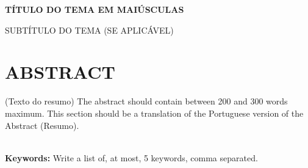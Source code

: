 \begingroup
\begin{flushleft}
\bfseries
{}
{\Large
TÍTULO DO TEMA EM MAIÚSCULAS}
	
\mdseries		%
{\Large SUBTÍTULO DO TEMA (SE APLICÁVEL)}
\end{flushleft}
\normalsize
\let\clearpage\relax
\chapter{ABSTRACT}
\endgroup

(Texto do resumo)
The abstract should contain between 200 and 300 words maximum.  
This section should be a translation of the Portuguese version of the Abstract (Resumo). 






\hspace{3cm}\\		%
\indent				%
\textbf{Keywords: } Write a list of, at most, 5 keywords, comma separated.

